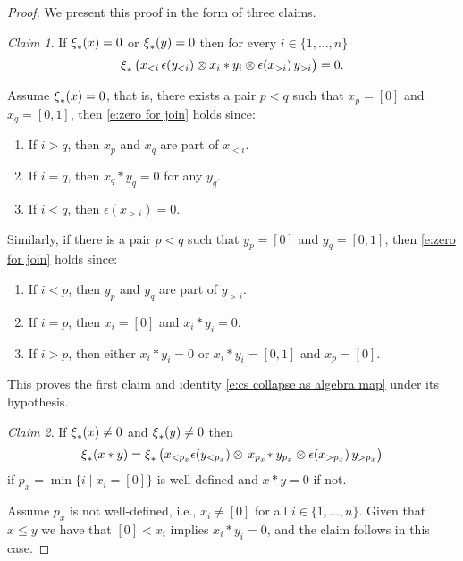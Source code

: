 \begin{proof}
	We present this proof in the form of three claims. \newline

	\noindent \textit{Claim 1}.
	If $\operatorname{\xi}_\ast(x) = 0$ or $\operatorname{\xi}_\ast(y) = 0$ then for every $i \in \{1, \dots, n\}$
	\begin{equation} \label{e:zero for join}
	\operatorname{\xi}_\ast \big( x_{<i}\, \epsilon(y_{<i}) \otimes x_i \ast y_i \otimes \epsilon(x_{>i}) \, y_{>i} \big) = 0.
	\end{equation}

	Assume $\operatorname{\xi}_\ast(x) = 0$, that is, there exists a pair $p < q$ such that $x_p = [0]$ and $x_q = [0,1]$, then \eqref{e:zero for join} holds since:
	\begin{enumerate}
		\item If $i > q$, then $x_p$ and $x_q$ are part of $x_{<i}$.
		\item If $i = q$, then $x_q \ast y_q = 0$ for any $y_q$.
		\item If $i < q$, then $\epsilon(x_{>i}) = 0$.
	\end{enumerate}
	Similarly, if there is a pair $p < q$ such that $y_p = [0]$ and $y_q = [0,1]$,  then \eqref{e:zero for join} holds since:
	\begin{enumerate}
		\item If $i < p$, then $y_p$ and $y_q$ are part of $y_{>i}$.
		\item If $i = p$, then $x_i = [0]$ and $x_i \ast y_i = 0$.
		\item If $i > p$, then either $x_i \ast y_i = 0$ or $x_i \ast y_i = [0,1]$ and $x_p = [0]$.
	\end{enumerate}
	This proves the first claim and identity \eqref{e:cs collapse as algebra map} under its hypothesis. \newline

	\noindent \textit{Claim 2}.
	If $\operatorname{\xi}_\ast(x) \neq 0$ and $\operatorname{\xi}_\ast(y) \neq 0$ then
	\[
	\operatorname{\xi}_\ast(x \ast y) =
	\operatorname{\xi}_\ast \big( x_{<p_x} \epsilon(y_{<p_x}) \otimes \, x_{p_x} \! \ast y_{p_x} \otimes \epsilon(x_{>p_x}) \, y_{>p_x} \big)
	\]
	if $p_x = \min \big\{ i \mid x_i = [0] \big\}$ is well-defined and $x \ast y = 0$ if not.

	Assume $p_x$ is not well-defined, i.e., $x_i \neq [0]$ for all $i \in \{1, \dots, n\}$.
	Given that $x \leq y$ we have that $[0] < x_i$ implies $x_i \ast y_i = 0$, and the claim follows in this case.


\end{proof}

